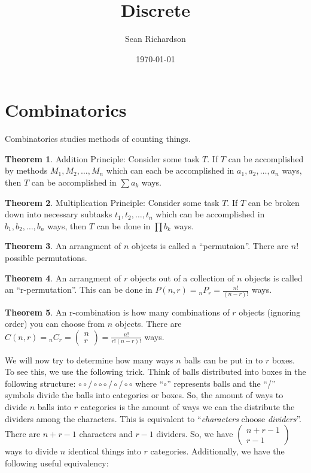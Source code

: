 \documentclass[11pt]{article}
\theoremstyle{definition}
\newtheorem{theorem}{Theorem}[section]
\begin{document}
\title{Discrete}
\author{Sean Richardson}
\date{\today}
\maketitle

\section{Combinatorics}

Combinatorics studies methods of counting things.

\begin{theorem}
    Addition Principle: Consider some task $T$. If $T$ can be accomplished by methods $M_1,M_2,\dots,M_n$ which can each be accomplished in $a_1, a_2, \dots, a_n$ ways, then $T$ can be accomplished in $\sum a_k$ ways.
\end{theorem}
\begin{theorem}
    Multiplication Principle: Consider some task $T$. If $T$ can be broken down into necessary subtasks $t_1,t_2,\dots,t_n$ which can be accomplished in $b_1,b_2,\dots,b_n$ ways, then $T$ can be done in $\prod b_k$ ways.
\end{theorem}
\begin{theorem}
    An arrangment of $n$ objects is called a ``permutaion''. There are $n!$ possible permutations.
\end{theorem}
\begin{theorem}
    An arrangment of $r$ objects out of a collection of $n$ objects is called an ``r-permutation''. This can be done in $P(n,r)= {}_{n}P_r = \frac{n!}{(n-r)!}$ ways.
\end{theorem}
\begin{theorem}
    An r-combination is how many combinations of $r$ objects (ignoring order) you can choose from $n$ objects. There are $C(n,r)={}_{n}C_r=(\begin{smallmatrix}n \\ r \end{smallmatrix}) = \frac{n!}{r!(n-r)!}$ ways.
\end{theorem}
We will now try to determine how many ways $n$ balls can be put in to $r$ boxes. To see this, we use the following trick. Think of balls distributed into boxes in the following structure: $\circ \circ / \circ \circ \circ / \circ / \circ \circ$ where ``$\circ$'' represents balls and the ``/'' symbols divide the balls into categories or boxes. So, the amount of ways to divide $n$ balls into $r$ categories is the amount of ways we can the distribute the dividers among the characters. This is equivalent to ``\textit{characters} choose \textit{dividers}''. There are $n+r-1$ characters and $r-1$ dividers. So, we have $(\begin{smallmatrix} n+r-1 \\ r-1 \end{smallmatrix})$ ways to divide $n$ identical things into $r$ categories. Additionally, we have the following useful equivalency:
\end{document}
